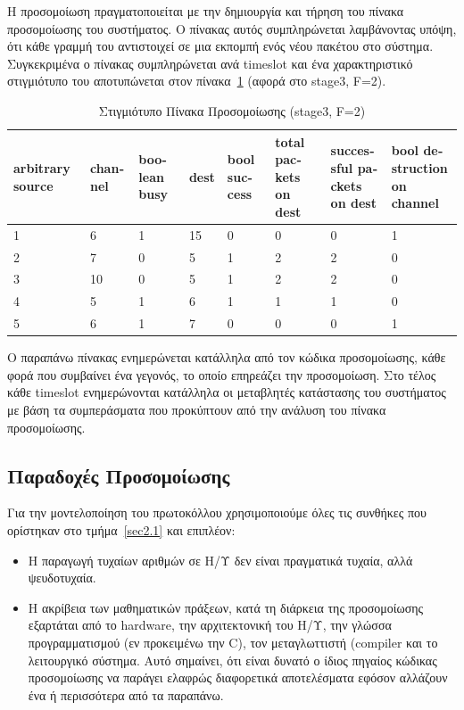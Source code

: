 \documentclass[12pt]{report}
\begin{document}
Η προσομοίωση πραγματοποιείται με την δημιουργία και τήρηση του πίνακα προσομοίωσης του συστήματος. Ο πίνακας αυτός συμπληρώνεται λαμβάνοντας υπόψη, ότι κάθε γραμμή του αντιστοιχεί σε μια εκπομπή ενός νέου πακέτου στο σύστημα. Συγκεκριμένα ο πίνακας συμπληρώνεται ανά \textlatin{timeslot} και ένα χαρακτηριστικό στιγμιότυπο του αποτυπώνεται στον πίνακα~\ref{tab01} (αφορά στο \textlatin{stage3, F=2}).

\begin{table}[h!]
\centering
\scriptsize
\begin{tabular}{||p{1cm}|p{1cm}|p{1cm}|p{1cm}|p{1cm}|p{1cm}|p{1cm}|p{1cm}||}
\hline
\textlatin{arbitrary source} & \textlatin{channel} & \textlatin{boolean busy} & \textlatin{dest} & \textlatin{bool success} & \textlatin{total packets on dest} & \textlatin{successful packets on dest} & \textlatin{bool destruction on channel} \\ [0.5ex]
\hline\hline
1 & 6  & 1 & 15 & 0 & 0 & 0 & 1\\ 
2 & 7  & 0 & 5  & 1 & 2 & 2 & 0\\
3 & 10 & 0 & 5  & 1 & 2 & 2 & 0\\
4 & 5  & 1 & 6  & 1 & 1 & 1 & 0\\
5 & 6  & 1 & 7  & 0 & 0 & 0 & 1\\ [1ex] 
\hline
\end{tabular}
\caption{Στιγμιότυπο Πίνακα Προσομοίωσης (\textlatin{stage3, F=2})}
\label{tab01}
\end{table}

Ο παραπάνω πίνακας ενημερώνεται κατάλληλα από τον κώδικα προσομοίωσης, κάθε φορά που συμβαίνει ένα γεγονός, το οποίο επηρεάζει την προσομοίωση. Στο τέλος κάθε \textlatin{timeslot} ενημερώνονται κατάλληλα οι μεταβλητές κατάστασης του συστήματος με βάση τα συμπεράσματα που προκύπτουν από την ανάλυση του πίνακα προσομοίωσης.

\subsection{Παραδοχές Προσομοίωσης}
Για την μοντελοποίηση του πρωτοκόλλου χρησιμοποιούμε όλες τις συνθήκες που ορίστηκαν στο τμήμα~\ref{sec2.1} και επιπλέον:
\begin{itemize}
	\item Η παραγωγή τυχαίων αριθμών σε Η/Υ δεν είναι πραγματικά τυχαία, αλλά ψευδοτυχαία.
	\item Η ακρίβεια των μαθηματικών πράξεων, κατά τη διάρκεια της προσομοίωσης εξαρτάται από το \textlatin{hardware}, την αρχιτεκτονική του Η/Υ, την γλώσσα προγραμματισμού (εν προκειμένω την \textlatin{C}), τον μεταγλωττιστή (\textlatin{compiler} και το λειτουργικό σύστημα. Αυτό σημαίνει, ότι είναι δυνατό ο ίδιος πηγαίος κώδικας προσομοίωσης να παράγει ελαφρώς διαφορετικά αποτελέσματα εφόσον αλλάζουν ένα ή περισσότερα από τα παραπάνω.
\end{itemize}
\end{document}
